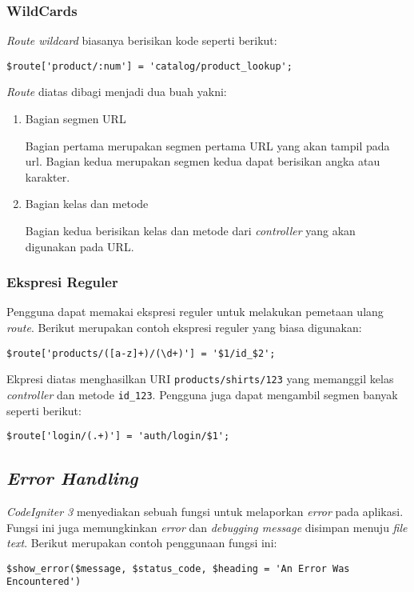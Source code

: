 \subsubsection{WildCards}

\textit{Route wildcard} biasanya berisikan kode seperti berikut:

\begin{center}
\verb|$route['product/:num'] = 'catalog/product_lookup';|
\end{center}

\textit{Route} diatas dibagi menjadi dua buah yakni:
\begin{enumerate}
\item Bagian segmen URL

Bagian pertama merupakan segmen pertama URL yang akan tampil pada url. Bagian kedua merupakan segmen kedua dapat berisikan angka atau karakter.

\item Bagian kelas dan metode

Bagian kedua berisikan kelas dan metode dari \textit{controller} yang akan digunakan pada URL.

\end{enumerate} 

\subsubsection{Ekspresi Reguler}

Pengguna dapat memakai ekspresi reguler untuk melakukan pemetaan ulang \textit{route}. Berikut merupakan contoh ekspresi reguler yang biasa digunakan:

\begin{center}
\verb|$route['products/([a-z]+)/(\d+)'] = '$1/id_$2';|
\end{center}

Ekpresi diatas menghasilkan URI \texttt{products/shirts/123} yang memanggil kelas \textit{controller} dan metode \texttt{id\_123}. Pengguna juga dapat mengambil segmen banyak seperti berikut:
\begin{center}
\verb|$route['login/(.+)'] = 'auth/login/$1';|
\end{center}

\subsection{\textit{Error Handling}}
\textit{CodeIgniter 3} menyediakan sebuah fungsi untuk melaporkan \textit{error} pada aplikasi. Fungsi ini juga memungkinkan \textit{error} dan \textit{debugging message} disimpan menuju \textit{file} \textit{text}. Berikut merupakan contoh penggunaan fungsi ini:
\begin{center}
\verb|$show_error($message, $status_code, $heading = 'An Error Was Encountered')|
\end{center}

